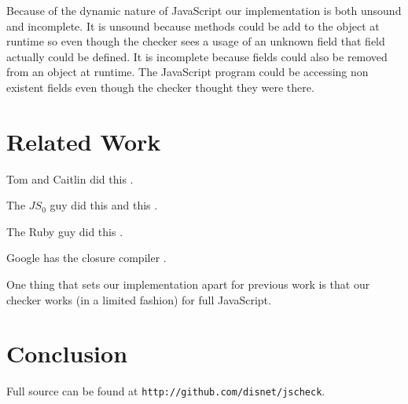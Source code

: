 \documentclass{article}
\begin{document}
Because of the dynamic nature of JavaScript our implementation is both unsound 
and incomplete. It is unsound because methods could be add to the object at
runtime so even though the checker sees a usage of an unknown field that field
actually could be defined. It is incomplete because fields could also be removed
from an object at runtime. The JavaScript program could be accessing non existent 
fields even though the checker thought they were there.

\section{Related Work}
\label{sec:related}

Tom and Caitlin did this \cite{fwjsStruct}.

The $JS_0$ guy did this \cite{typeinferenceforjavascriptEcoop} and this \cite{typecheckingforjavascript}.

The Ruby guy did this \cite{typecheckingruby}.

Google has the closure compiler \cite{closureCompiler}.

One thing that sets our 
implementation apart for previous work is that our checker works (in a limited fashion) for
full JavaScript.

\section{Conclusion}
\label{sec:conclusion}
Full source can be found at {\tt http://github.com/disnet/jscheck}.



\end{document}
